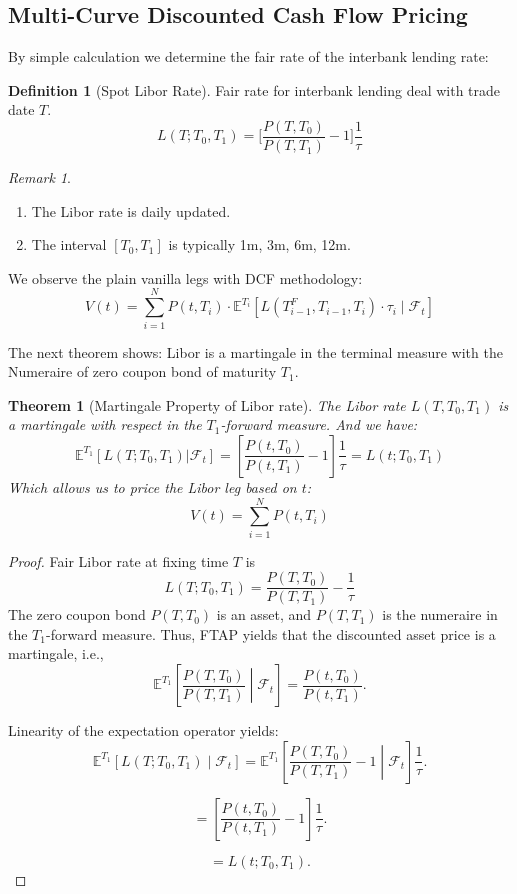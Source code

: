 \documentclass[a4paper,11pt]{book}
\newtheorem{theorem}{Theorem}[section]
\theoremstyle{definition}
\newtheorem{definition}{Definition}[section]
\theoremstyle{remark}
\newtheorem*{remark}{Remark}
\begin{document}
\subsection{Multi-Curve Discounted Cash Flow Pricing}
By simple calculation we determine the fair rate of the interbank lending rate:
\begin{definition}[Spot Libor Rate]
Fair rate for interbank lending deal with trade date $T$.
\begin{equation*}
	L(T;T_0, T_1) = \bigg[\frac{P(T, T_0)}{P(T, T_1)} - 1\bigg] \frac{1}{\tau}
\end{equation*}
\end{definition}
\begin{remark}
\quad
\begin{enumerate}
	\item The Libor rate is daily updated.
	\item The interval $[T_0, T_1]$ is typically 1m, 3m, 6m, 12m. 
\end{enumerate}	
\end{remark}

We observe the plain vanilla legs with DCF methodology: 
\[
V(t) = \sum_{i=1}^{N} P(t, T_i) \cdot \mathbb{E}^{T_i} \left[ L(T_{i-1}^F, T_{i-1}, T_i) \cdot \tau_i \mid \mathcal{F}_t \right]
\]



The next theorem shows: Libor is a martingale in the terminal measure with the Numeraire of zero coupon bond of maturity $T_1$.

\begin{theorem}[Martingale Property of Libor rate]
	The Libor rate $L(T, T_0, T_1)$ is a martingale with respect in the $T_1$-forward measure. And we have:
	\begin{equation*}
		\mathbb{E}^{T_1} [L(T;T_0, T_1)|\mathcal{F}_t] = \left[\frac{P(t, T_0)}{P(t, T_1)} - 1\right] \frac{1}{\tau} = L(t; T_0, T_1)
	\end{equation*}
	Which allows us to price the Libor leg based on $t$:
	\begin{equation*}
		V(t) = \sum^N_{i = 1} P(t, T_i) 
	\end{equation*}
\end{theorem}
\begin{proof}
Fair Libor rate at fixing time $T$ is
\[
L(T; T_0, T_1) = \frac{P(T, T_0)}{P(T, T_1)} - \frac{1}{\tau}
\]
The zero coupon bond $P(T, T_0)$ is an asset, and $P(T, T_1)$ is the numeraire in the $T_1$-forward measure. Thus, FTAP yields that the discounted asset price is a martingale, i.e.,
\[
\mathbb{E}^{T_1} \left[\frac{P(T, T_0)}{P(T, T_1)} \middle| \mathcal{F}_t \right] = \frac{P(t, T_0)}{P(t, T_1)}.
\]

Linearity of the expectation operator yields:
\[
\mathbb{E}^{T_1} \left[L(T; T_0, T_1) \middle| \mathcal{F}_t \right] = \mathbb{E}^{T_1} \left[\frac{P(T, T_0)}{P(T, T_1)} - 1 \middle| \mathcal{F}_t \right] \frac{1}{\tau}.
\]

\[
= \left[\frac{P(t, T_0)}{P(t, T_1)} - 1\right] \frac{1}{\tau}.
\]

\[
= L(t; T_0, T_1).
\]
\end{proof}
\end{document}

